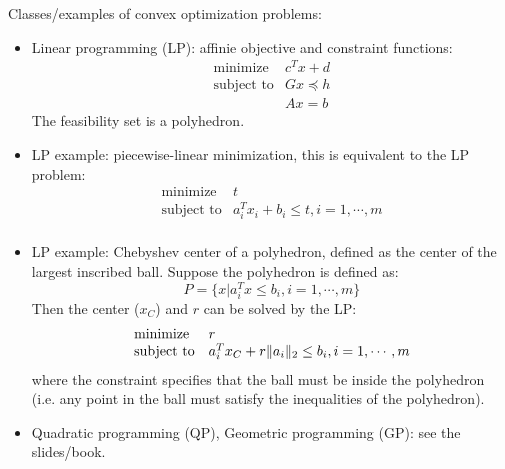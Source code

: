 \documentclass{report}
\begin{document}
Classes/examples of convex optimization problems: 
\begin{itemize}
\item Linear programming (LP): affinie objective and constraint functions:
\begin{equation}
\begin{array}{ll}
\text{minimize} & c^T x + d \\
\text{subject to} & G x \preceq h\\
 & Ax = b
\end{array}
\end{equation}
The feasibility set is a polyhedron. 

\item LP example: piecewise-linear minimization, this is equivalent to the LP problem: 
\begin{equation}
\begin{array}{ll}
\text{minimize} & t \\
\text{subject to} & a_i^T x_i + b_i \leq t, i = 1, \cdots, m\\
\end{array}
\end{equation}

\item LP example: Chebyshev center of a polyhedron, defined as the center of the largest inscribed ball. Suppose the polyhedron is defined as: 
\begin{equation}
P = \{ x| a_i^T x \leq b_i, i = 1, \cdots, m\}	
\end{equation}
Then the center ($x_C$) and $r$ can be solved by the LP:
\begin{equation}
\begin{array}{ll}
\text{minimize} & r \\
\text{subject to} & a_i^T x_C + r \lVert a_i\rVert_2 \leq b_i, i = 1, \cdots, m\\
\end{array}
\end{equation}
where the constraint specifies that the ball must be inside the polyhedron (i.e. any point in the ball must satisfy the inequalities of the polyhedron). 

\item Quadratic programming (QP), Geometric programming (GP): see the slides/book. 
\end{itemize}
\end{document}
